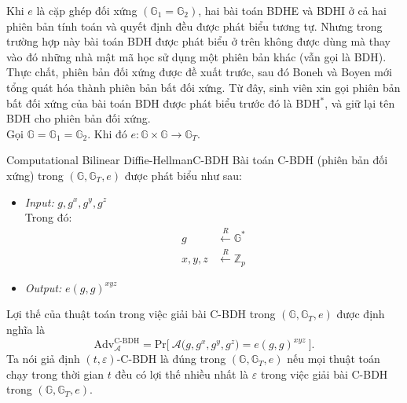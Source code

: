 \documentclass[class=report, crop=false]{standalone}
\begin{document}
		Khi $e$ là cặp ghép đối xứng $(\mathbb{G}_1 = \mathbb{G}_2)$, hai bài toán BDHE và BDHI ở cả hai phiên bản tính toán và quyết định đều được phát biểu tương tự. Nhưng trong trường hợp này bài toán BDH được phát biểu ở trên không được dùng mà thay vào đó những nhà mật mã học sử dụng một phiên bản khác (vẫn gọi là BDH). Thực chất, phiên bản đối xứng được đề xuất trước, sau đó Boneh và Boyen \cite{DBLP:journals/joc/BonehB11} mới tổng quát hóa thành phiên bản bất đối xứng. Từ đây, sinh viên xin gọi phiên bản bất đối xứng của bài toán BDH được phát biểu trước đó là BDH$^*$, và giữ lại tên BDH cho phiên bản đối xứng. \\ \indent
		Gọi $\mathbb{G} = \mathbb{G}_1 = \mathbb{G}_2$. Khi đó $e: \mathbb{G} \times \mathbb{G} \rightarrow \mathbb{G}_T$.
		\begin{problem}{Computational Bilinear Diffie-Hellman}{C-BDH}
			Bài toán C-BDH (phiên bản đối xứng) trong $(\mathbb{G}, \mathbb{G}_T, e)$ được phát biểu như sau:
			\vspace{-\baselineskip}
			\begin{itemize}[leftmargin=1.5cm, itemindent=-0.5cm]
				\item[] \textit{Input:} $g, g^x, g^y, g^z$ \\
				Trong đó: \vspace{-\baselineskip}
				\begin{align*}
					g 			&\xleftarrow{R} \mathbb{G}^* \\
					x, y, z 	&\xleftarrow{R} \mathbb{Z}_p
				\end{align*}
				\item[] \textit{Output:} $e(g, g)^{xyz}$
			\end{itemize}
			\vspace{-\baselineskip}\par
			Lợi thế của thuật toán \algo trong việc giải bài C-BDH trong $(\mathbb{G}, \mathbb{G}_T, e)$ được định nghĩa là
			\[
				\text{Adv}_{\mathcal{A}}^{\text{C-BDH}} = \text{Pr}\bigg[ \ \mathcal{A}\Big(g, g^x, g^y, g^z \Big) = e(g, g)^{xyz} \ \bigg].
			\] \indent
			Ta nói giả định $(t, \varepsilon)$-C-BDH là đúng trong $(\mathbb{G}, \mathbb{G}_T, e)$ nếu mọi thuật toán chạy trong thời gian $t$ đều có lợi thế nhiều nhất là $\varepsilon$ trong việc giải bài C-BDH trong $(\mathbb{G}, \mathbb{G}_T, e)$.
		\end{problem}
\end{document}
